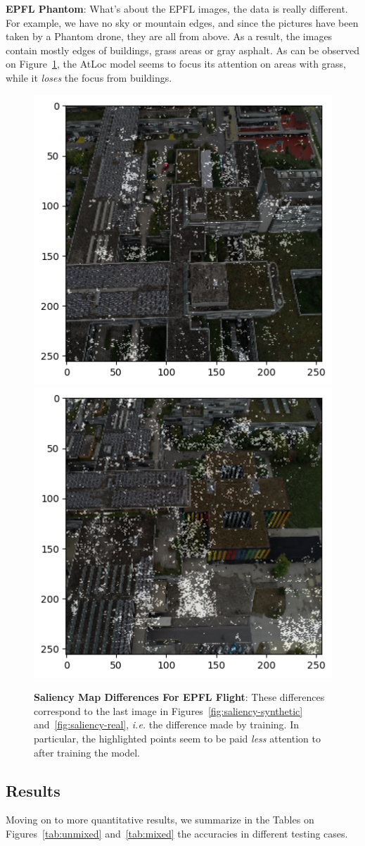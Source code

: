 \documentclass[10pt,conference,compsocconf]{IEEEtran}
\begin{document}
\textbf{EPFL Phantom}: What's about the EPFL images, the data is really different. For example, we have no sky or mountain edges, and since the pictures have been taken by a Phantom drone, they are all from above. As a result, the images contain mostly edges of buildings, grass areas or gray asphalt. As can be observed on Figure~\ref{fig:saliency-epfl}, the AtLoc model seems to focus its attention on areas with grass, while it \emph{loses} the focus from buildings. 

\begin{figure}[hbpt]
\scriptsize
\includegraphics[width=0.45\linewidth]{images/AttentionMap_12.png}\hfill
\includegraphics[width=0.45\linewidth]{images/AttentionMap_18.png}
\caption{\textbf{Saliency Map Differences For EPFL Flight}: These differences correspond to the last image in Figures~\ref{fig:saliency-synthetic} and~\ref{fig:saliency-real}, \emph{i.e.} the difference made by training. In particular, the highlighted points seem to be paid \emph{less} attention to after training the model.}
\label{fig:saliency-epfl}
\end{figure}


\subsection{Results}

Moving on to more quantitative results, we summarize in the Tables on Figures~\ref{tab:unmixed} and~\ref{tab:mixed} the accuracies in different testing cases.
\end{document}
